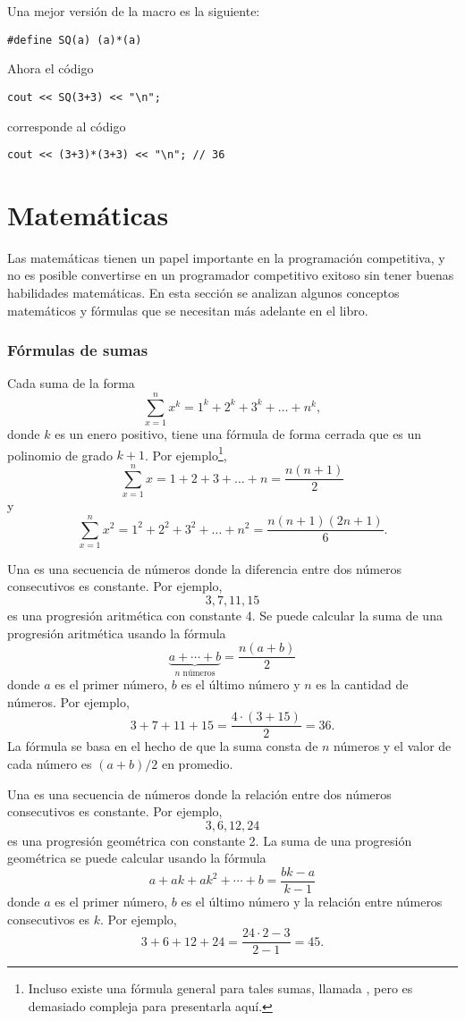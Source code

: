 Una mejor versión de la macro es la siguiente:
\begin{lstlisting}
#define SQ(a) (a)*(a)
\end{lstlisting}
Ahora el código
\begin{lstlisting}
cout << SQ(3+3) << "\n";
\end{lstlisting}
corresponde al código
\begin{lstlisting}
cout << (3+3)*(3+3) << "\n"; // 36
\end{lstlisting}


\section{Matemáticas}

Las matemáticas tienen un papel importante en la programación
competitiva, y no es posible convertirse en
un programador competitivo exitoso sin
tener buenas habilidades matemáticas.
En esta sección se analizan algunos
conceptos matemáticos y fórmulas que
se necesitan más adelante en el libro.

\subsubsection{Fórmulas de sumas}

Cada suma de la forma
\[\sum_{x=1}^n x^k = 1^k+2^k+3^k+\ldots+n^k,\]
donde $k$ es un enero positivo,
tiene una fórmula de forma cerrada que es un
polinomio de grado $k+1$.
Por ejemplo\footnote{
Incluso existe una fórmula general para tales sumas, llamada ,
pero es demasiado compleja para presentarla aquí.},
\[\sum_{x=1}^n x = 1+2+3+\ldots+n = \frac{n(n+1)}{2}\]
y
\[\sum_{x=1}^n x^2 = 1^2+2^2+3^2+\ldots+n^2 = \frac{n(n+1)(2n+1)}{6}.\]

Una  es una 
secuencia de números
donde la diferencia entre dos números consecutivos
es constante.
Por ejemplo,
\[3, 7, 11, 15\]
es una progresión aritmética con constante 4.
Se puede calcular la suma de una progresión aritmética
usando la fórmula
\[\underbrace{a + \cdots + b}_{n \,\, \textrm{números}} = \frac{n(a+b)}{2}\]
donde $a$ es el primer número,
$b$ es el último número y
$n$ es la cantidad de números.
Por ejemplo,
\[3+7+11+15=\frac{4 \cdot (3+15)}{2} = 36.\]
La fórmula se basa en el hecho
de que la suma consta de $n$ números y
el valor de cada número es $(a+b)/2 $ en promedio.

Una  es una secuencia
de números
donde la relación entre dos números consecutivos
es constante.
Por ejemplo,
\[3,6,12,24\]
es una progresión geométrica con constante 2.
La suma de una progresión geométrica se puede calcular
usando la fórmula
\[a + ak + ak^2 + \cdots + b = \frac{bk-a}{k-1}\]
donde $a$ es el primer número,
$b$ es el último número y la
relación entre números consecutivos es $k$.
Por ejemplo,
\[3+6+12+24=\frac{24 \cdot 2 - 3}{2-1} = 45.\]

